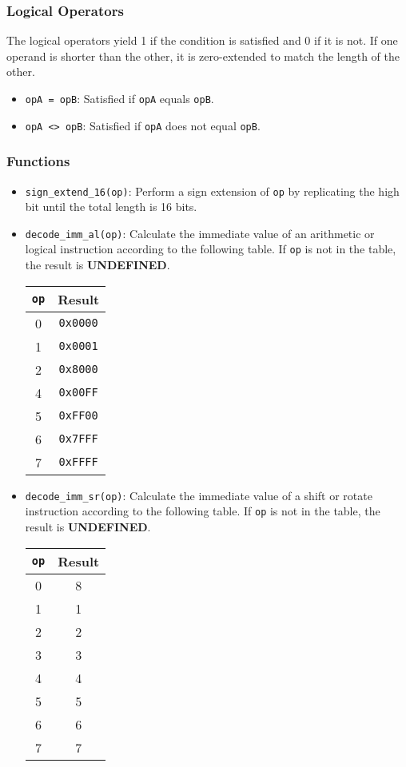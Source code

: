 \documentclass[12pt,a4paper]{article}
\newcommand{\undefined}{\textbf{UNDEFINED}}
\begin{document}
\subsubsection{Logical Operators}
The logical operators yield 1 if the condition is satisfied and 0 if it is not. If one operand is shorter than the other, it is zero-extended to match the length of the other.

\begin{itemize}
  \item \texttt{opA = opB}: Satisfied if \texttt{opA} equals \texttt{opB}.
  \item \texttt{opA <> opB}: Satisfied if \texttt{opA} does not equal \texttt{opB}.
\end{itemize}

\subsubsection{Functions}

\begin{itemize}
  \item \texttt{sign\_extend\_16(op)}: Perform a sign extension of \texttt{op} by replicating the high bit until the total length is 16 bits.
  \item \texttt{decode\_imm\_al(op)}: Calculate the immediate value of an arithmetic or logical instruction according to the following table. If \texttt{op} is not in the table, the result is \undefined.\linebreak
    \begin{tabular}{|c c|}
    \hline
    \texttt{op} & Result \\
    \hline
    0 & \texttt{0x0000} \\
    1 & \texttt{0x0001} \\
    2 & \texttt{0x8000} \\
    4 & \texttt{0x00FF} \\
    5 & \texttt{0xFF00} \\
    6 & \texttt{0x7FFF} \\
    7 & \texttt{0xFFFF} \\
    \hline
    \end{tabular}
  \item \texttt{decode\_imm\_sr(op)}: Calculate the immediate value of a shift or rotate instruction according to the following table. If \texttt{op} is not in the table, the result is \undefined.\linebreak
    \begin{tabular}{|c c|}
    \hline
    \texttt{op} & Result \\
    \hline
    0 & 8 \\
    1 & 1 \\
    2 & 2 \\
    3 & 3 \\
    4 & 4 \\
    5 & 5 \\
    6 & 6 \\
    7 & 7 \\
    \hline
    \end{tabular}
\end{itemize}
\end{document}
